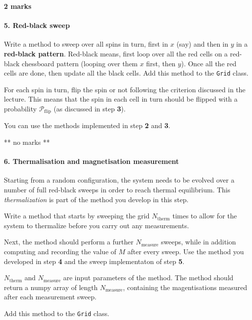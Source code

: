 \documentclass[11pt]{article}
\begin{document}
\textbf{2 marks}

    \hypertarget{red-black-sweep}{%
\paragraph{5. Red-black sweep}\label{red-black-sweep}}

Write a method to sweep over all spins in turn, first in \(x\) (say) and
then in \(y\) in a \textbf{red-black pattern}. Red-black means, first
loop over all the red cells on a red-black chessboard pattern (looping
over them \(x\) first, then \(y\)). Once all the red cells are done,
then update all the black cells. Add this method to the \texttt{Grid}
class.

For each spin in turn, flip the spin or not following the criterion
discussed in the lecture. This means that the spin in each cell in turn
should be flipped with a probability \(\mathcal{P}_\mathrm{flip}\) (as
discussed in step \textbf{3}).

You can use the methods implemented in step \textbf{2} and \textbf{3}.

** no marks **

    \hypertarget{thermalisation-and-magnetisation-measurement}{%
\paragraph{6. Thermalisation and magnetisation
measurement}\label{thermalisation-and-magnetisation-measurement}}

Starting from a random configuration, the system needs to be evolved
over a number of full red-black sweeps in order to reach thermal
equilibrium. This \emph{thermalization} is part of the method you
develop in this step.

Write a method that starts by sweeping the grid \(N_\mathrm{therm}\)
times to allow for the system to thermalize before you carry out any
measurements.

Next, the method should perform a further \(N_\mathrm{measure}\) sweeps,
while in addition computing and recording the value of \(M\) after every
sweep. Use the method you developed in step \textbf{4} and the sweep
implementaton of step \textbf{5}.

\(N_\mathrm{therm}\) and \(N_\mathrm{measure}\) are input parameters of
the method. The method should return a numpy array of length
\(N_\mathrm{measure}\), containing the magentisations measured after
each measurement sweep.

Add this method to the \texttt{Grid} class.
\end{document}
